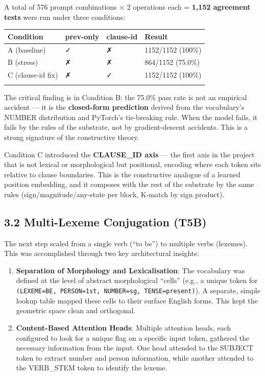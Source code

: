 \documentclass[
  twocolumn,
  10pt,
  a4paper]{article}
\newenvironment{tsxtable}{\begin{center}\footnotesize}{\end{center}}
\let\endhead\relax
\begin{document}
A total of 576 prompt combinations × 2 operations each = \textbf{1,152
agreement tests} were run under three conditions:

\begin{tsxtable}\begin{tabularx}{\linewidth}{@{}YYYY@{}}
\toprule\noalign{}
Condition & prev-only & clause-id & Result \\
\midrule\noalign{}
\endhead
A (baseline) & ✓ & ✗ & 1152/1152 (100\%) \\
B (stress) & ✗ & ✗ & 864/1152 (75.0\%) \\
C (clause-id fix) & ✗ & ✓ & 1152/1152 (100\%) \\
\bottomrule\noalign{}
\end{tabularx}\end{tsxtable}

The critical finding is in Condition B: the 75.0\% pass rate is not an
empirical accident --- it is the \textbf{closed-form prediction} derived
from the vocabulary's NUMBER distribution and PyTorch's tie-breaking
rule. When the model fails, it fails by the rules of the substrate, not
by gradient-descent accidents. This is a strong signature of the
constructive theory.

Condition C introduced the \textbf{CLAUSE\_ID axis} --- the first axis
in the project that is not lexical or morphological but positional,
encoding where each token sits relative to clause boundaries. This is
the constructive analogue of a learned position embedding, and it
composes with the rest of the substrate by the same rules
(sign/magnitude/any-state per block, K-match by sign product).

\hypertarget{multi-lexeme-conjugation-t5b}{%
\subsection{3.2 Multi-Lexeme Conjugation
(T5B)}\label{multi-lexeme-conjugation-t5b}}

The next step scaled from a single verb (``to be'') to multiple verbs
(lexemes). This was accomplished through two key architectural insights:

\begin{enumerate}
\def\labelenumi{\arabic{enumi}.}
\item
  \textbf{Separation of Morphology and Lexicalisation}: The vocabulary
  was defined at the level of abstract morphological ``cells'' (e.g., a
  unique token for
  \texttt{(LEXEME=BE,\ PERSON=1st,\ NUMBER=sg,\ TENSE=present)}). A
  separate, simple lookup table mapped these cells to their surface
  English forms. This kept the geometric space clean and orthogonal.
\item
  \textbf{Content-Based Attention Heads}: Multiple attention heads, each
  configured to look for a unique flag on a specific input token,
  gathered the necessary information from the input. One head attended
  to the SUBJECT token to extract number and person information, while
  another attended to the VERB\_STEM token to identify the lexeme.
\end{enumerate}
\end{document}
